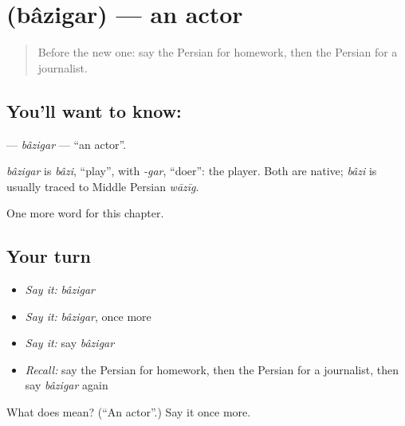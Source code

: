 \section[\texorpdfstring{\fa{بازیگر} (bâzigar)}{بازیگر (bâzigar)}]{ (bâzigar) — an actor}

\label{lesson:FA-C215-bazigar}



\begin{quote}
Before the new one: say the Persian for homework, then the Persian for a journalist.
\end{quote}

\subsection*{You'll want to know: }
\textbf{} — \emph{bâzigar} — \textquotedblleft{}an actor\textquotedblright{}.

\begin{cousinweb}
\emph{bâzigar} is \emph{bâzi}, \textquotedblleft{}play\textquotedblright{}, with \emph{-gar}, \textquotedblleft{}doer\textquotedblright{}: the player. Both are native; \emph{bâzi} is usually traced to Middle Persian \emph{wāzīg}.
\end{cousinweb}

\begin{grammarlens}[title={What you've built}]
One more word for this chapter.
\end{grammarlens}

\subsection*{Your turn}
\begin{itemize}
\raggedright
  \item \emph{Say it:} \emph{bâzigar}
  \item \emph{Say it:} \emph{bâzigar}, once more
  \item \emph{Say it:} say \emph{bâzigar}
  \item \emph{Recall:} say the Persian for homework, then the Persian for a journalist, then say \emph{bâzigar} again
\end{itemize}

\begin{tcolorbox}[breakable,colback=teal!4,colframe=teal!35!black,title={Before you move on}]
What does  mean? (\textquotedblleft{}An actor\textquotedblright{}.) Say it once more.
\end{tcolorbox}
